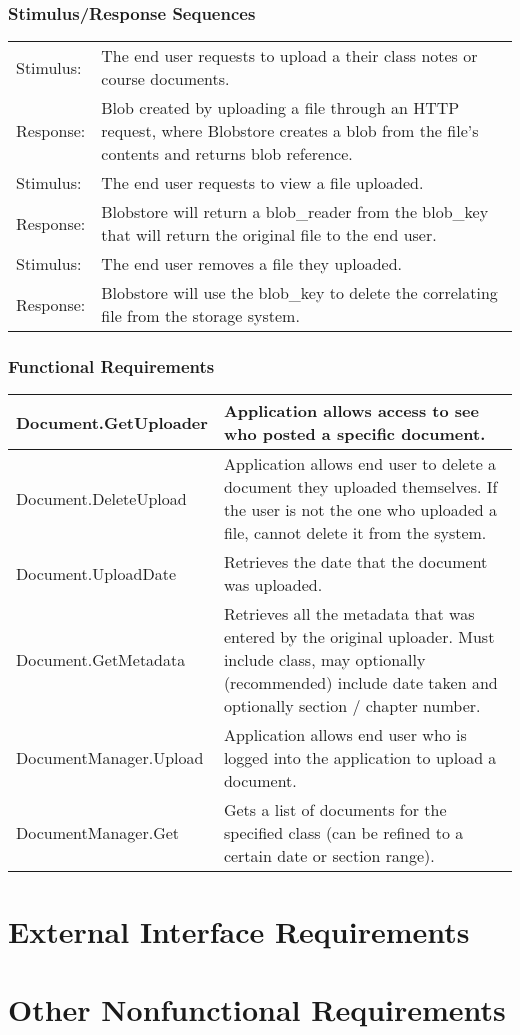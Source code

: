 \documentclass{scrreprt}
\begin{document}
\subsection{Stimulus/Response Sequences}
\begin{tabular}{| p{2cm} | p{12cm} | }
	\hline
	Stimulus: & The end user requests to upload a their class notes or course documents. \\
	Response: & Blob created by uploading a file through an HTTP request, where Blobstore creates a blob from the file’s contents and returns blob reference. \\ \hline
	Stimulus: & The end user requests to view a file uploaded. \\
	Response: & Blobstore will return a blob_reader from the blob_key that will return the original file to the end user. \\ \hline
	Stimulus: & The end user removes a file they uploaded.\\
	Response: & Blobstore will use the blob_key to delete the correlating file from the storage system.\\
	\hline

\end{tabular}

\subsection{Functional Requirements}

\begin{tabular}{| p{4.5cm} | p{9.5cm} |}
\hline
Document.GetUploader & Application allows access to see who posted a specific document. \\ \hline
Document.DeleteUpload & Application allows end user to delete a document they uploaded themselves. If the user is not the one who uploaded a file, cannot delete it from the system. \\ \hline
Document.UploadDate & Retrieves the date that the document was uploaded. \\ \hline
Document.GetMetadata & Retrieves all the metadata that was entered by the original uploader. Must include class, may optionally (recommended) include date taken and optionally section / chapter number. \\ \hline
DocumentManager.Upload & Application allows end user who is logged into the application to upload a document. \\ \hline
DocumentManager.Get & Gets a list of documents for the specified class (can be refined to a certain date or section range). \\

\hline
\end{tabular}

\chapter{External Interface Requirements}

\chapter{Other Nonfunctional Requirements}
\end{document}
